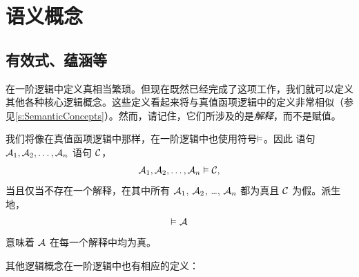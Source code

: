 \chapter{语义概念}

\section{有效式、蕴涵等}

在一阶逻辑中定义真相当繁琐。但现在既然已经完成了这项工作，我们就可以定义其他各种核心逻辑概念。这些定义看起来将与真值函项逻辑中的定义非常相似（参见\cref{s:SemanticConcepts}）。然而，请记住，它们所涉及的是\emph{解释}，而不是赋值。

我们将像在真值函项逻辑中那样，在一阶逻辑中也使用符号$\vDash$。因此
语句 $\mathcal{A}_1, \mathcal{A}_2, \ldots, \mathcal{A}_n$
语句 $\mathcal{C}$，
	$$\mathcal{A}_1, \mathcal{A}_2, \ldots, \mathcal{A}_n \vDash\mathcal{C},$$
当且仅当不存在一个解释，在其中所有 $\mathcal{A}_1$, $\mathcal{A}_2$, \dots, $\mathcal{A}_n$ 都为真且 $\mathcal{C}$ 为假。派生地，
	$$\vDash\mathcal{A}$$
意味着 $\mathcal{A}$ 在每一个解释中均为真。

其他逻辑概念在一阶逻辑中也有相应的定义：

